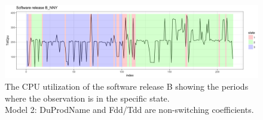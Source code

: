 \begin{figure}[H]
\begin{centering}
\includegraphics[scale=0.35]{picture/L16B_NNY1}
\par\end{centering}
\caption{The CPU utilization of the software release B showing the periods
where the observation is in the specific state. \protect \\
Model 2: DuProdName and Fdd/Tdd are non-switching coefficients.}
\label{L16B_NNY}
\end{figure}


